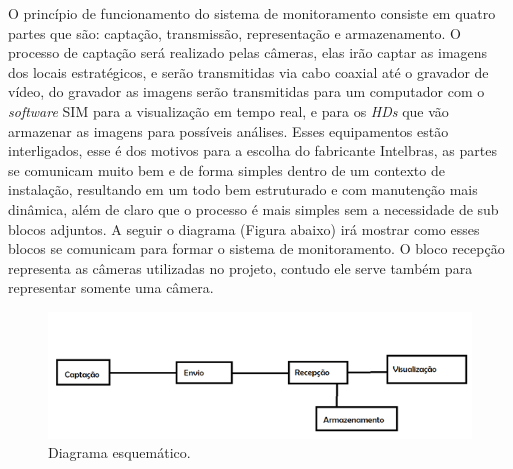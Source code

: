 	O princípio de funcionamento do sistema de monitoramento consiste em quatro partes que são: captação, transmissão, representação e armazenamento. O processo de captação será realizado pelas câmeras, elas irão captar as imagens dos locais estratégicos, e serão transmitidas via cabo coaxial até o gravador de vídeo, do gravador as imagens serão transmitidas para um computador com o \textit{software} SIM para a visualização em tempo real, e para os \textit{HDs} que vão armazenar as imagens para possíveis análises. Esses equipamentos estão interligados, esse é dos motivos para a escolha do fabricante Intelbras, as partes se comunicam muito bem e de forma simples dentro de um contexto de instalação, resultando em um todo bem estruturado e com manutenção mais dinâmica, além de claro que o processo é mais simples sem a necessidade de sub blocos adjuntos. A seguir o diagrama (Figura abaixo) irá mostrar como esses blocos se comunicam para formar o sistema de monitoramento. O bloco recepção representa as câmeras utilizadas no projeto, contudo ele serve também para representar somente uma câmera. 


	\begin{figure}[H]
	 \centering
	\label{Diagrama esquemático}
	 \includegraphics[keepaspectratio=true,scale=0.8]{monitoramento/25.png}
	 \caption{Diagrama esquemático.}
	\end{figure}

